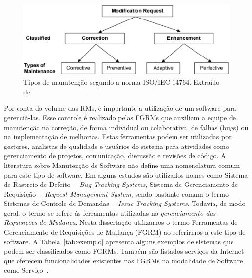 \begin{figure}[hbtp] \centering \includegraphics[width=.75\textwidth]
	{./chapter-intro/img/modification_request.eps} \caption{Tipos de manutenção
		segundo a norma ISO/IEC 14764. Extraído de~\cite{1703974}}
\label{fig:modification-request} \end{figure}

Por conta do volume das RMs, é importante a utilização de um software para
gerenciá-las. Esse controle é realizado pelas FGRMs que auxiliam a equipe de
manutenção na correção, de forma individual ou colaborativa, de falhas (bugs)
ou na implementação de melhorias. Estas ferramentas podem ser utilizadas por
gestores, analistas de qualidade e usuários do sistema para atividades como
gerenciamento de projetos, comunicação, discussão e revisões de código. A
literatura sobre Manutenção de Software não define uma nomenclatura comum para
este tipo de software. Em alguns estudos são utilizados nomes como Sistema de
Rastreio de Defeito~-~\textit{Bug Tracking Systems}, Sistema de Gerenciamento
de Requisição~-~\textit{Request Management System}, sendo bastante comum o
termo Sistemas de Controle de Demandas~-~\textit{Issue Tracking Systems}.
Todavia, de modo geral, o termo se refere às ferramentas utilizadas no
\textit{gerenciamento das Requisições de Mudança}. Nesta dissertação utilizamos
o termo Ferramentas de Gerenciamento de Requisições de Mudança (FGRM) ao
referirmos a este tipo de software. A Tabela~\ref{tab:exemplo} apresenta alguns
exemplos de sistemas que podem ser classificados como FGRMs. Também são
listados serviços da Internet que oferecem funcionalidades existentes nas FGRMs
na modalidade de Software como Serviço~\cite{fox2013engineering}.

